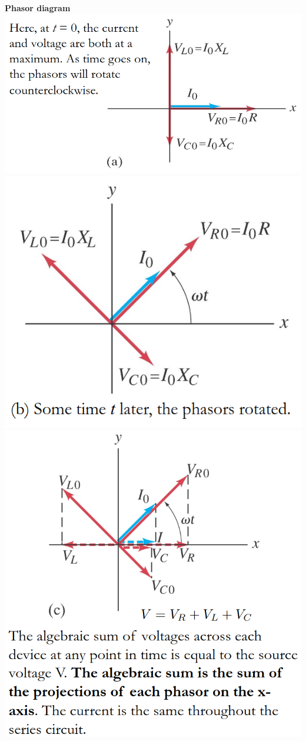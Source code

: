 \documentclass[10pt,landscape,a4paper]{article}
\begin{document}
\begin{multicols*}{5}
  \textbf{Phasor diagram} \\
  \includegraphics[width = 0.95\linewidth]{rcl-circuit-phasor-diagram-1}
  \includegraphics[width = 0.95\linewidth]{rcl-circuit-phasor-diagram-2}
  \includegraphics[width = \linewidth]{rcl-circuit-phasor-diagram-3}


\end{multicols*}
\end{document}

